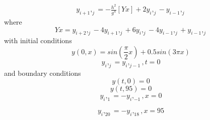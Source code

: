 \documentclass[conference]{IEEEtran}
\begin{document}
	\begin{align}
		\label{eqn: Derivative32}
		y_{i+1},_{j} = 
		-\frac{h^2}{g^4}\left[ Yx\right] + 2 y_{i},_{j} - y_{i-1},_{j}
	\end{align}
	where 
	\begin{equation}
		\label{eqn: Derivative33}
		Yx  = {y_{i+2},_{j} - 4 y_{i+1},_{j} + 6 y_{i},_{j} - 4 y_{i-1},_{j} + y_{i-1},_{j}}
	\end{equation}
	with initial conditions 
	\begin{equation}
		\label{eqn: Derivative34}
		y(0,x)  = sin(\frac{\pi}{2} x) + 0.5 sin (3\pi x)
	\end{equation} 
	\begin{equation}
		\label{eqn: Derivative35}
		{y_{i},_{j} = y_{i},_{j-1}, t = 0}  
	\end{equation} 
	and	boundary conditions
	\begin{equation}
		\label{eqn: Derivative36}
		{y(t,0) = 0}
	\end{equation} 
	\begin{equation}
		\label{eqn: Derivative37}
		{y(t,95) = 0}
	\end{equation} 
	\begin{equation}
		\label{eqn: Derivative38}
		{y_{i},_{1} = - y_{i},_{-1}, x = 0}  
	\end{equation}  

	\begin{equation}
		\label{eqn: Derivative39}
		{y_{i},_{20} = - y_{i},_{18}, x = 95}  
	\end{equation}  
\end{document}
